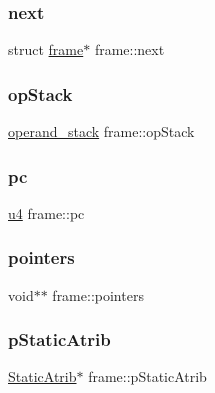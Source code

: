 \mbox{\label{structframe_a23c908c0892e1329c82f3673e1d659eb}} 
\subsubsection{\texorpdfstring{next}{next}}
{\footnotesize\ttfamily struct \hyperlink{structframe}{frame}$\ast$ frame\+::next}

\mbox{\label{structframe_ac87e8a50c7f6d37600c44c1faca0f530}} 
\subsubsection{\texorpdfstring{op\+Stack}{opStack}}
{\footnotesize\ttfamily \hyperlink{structoperand__stack}{operand\+\_\+stack} frame\+::op\+Stack}

\mbox{\label{structframe_ae2f8c8d0abb0ff0952fb8ab971c2d3d0}} 
\subsubsection{\texorpdfstring{pc}{pc}}
{\footnotesize\ttfamily \hyperlink{ClassLoader_8h_aedf6ddc03df8caaaccbb4c60b9a9b850}{u4} frame\+::pc}

\mbox{\label{structframe_a29911524013a45af719b6d19592dc60d}} 
\subsubsection{\texorpdfstring{pointers}{pointers}}
{\footnotesize\ttfamily void$\ast$$\ast$ frame\+::pointers}

\mbox{\label{structframe_adf21113594c388521fe0f3591241f597}} 
\subsubsection{\texorpdfstring{p\+Static\+Atrib}{pStaticAtrib}}
{\footnotesize\ttfamily \hyperlink{structStaticAtrib}{Static\+Atrib}$\ast$ frame\+::p\+Static\+Atrib}

